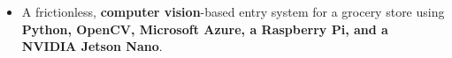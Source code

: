 \begin{cvvols}
{\begin{itemize}[leftmargin=2ex]
\vspace{-1mm}
\item A frictionless, \textbf{computer vision}-based entry system for a grocery store using \textbf{Python, OpenCV, Microsoft Azure, a Raspberry Pi, and a NVIDIA Jetson Nano}.
\end{itemize}
\vspace{-1mm}
\begin{center}
\end{center}
\vspace{-1mm}
}
\end{cvvols}